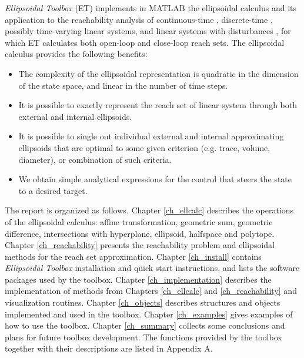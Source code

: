 {\it Ellipsoidal Toolbox} (ET) implements in MATLAB
the ellipsoidal calculus \cite{kurvalyi}
and its application to the reachability analysis of continuous-time
\cite{kurvar01}, discrete-time \cite{kurvar07}, possibly time-varying linear systems,
and linear systems with disturbances \cite{kurvar2},
for which ET calculates both open-loop and close-loop reach sets.
The ellipsoidal calculus provides the following benefits:
\begin{itemize}
\item The complexity of the
ellipsoidal representation is quadratic in the dimension of
the state space, and linear in the number of time steps.
\item It is possible to exactly represent the reach set of
linear system through both external and internal ellipsoids.
\item It is possible to single out individual external and internal
approximating ellipsoids that are optimal to some given criterion
(e.g. trace, volume, diameter), or combination of such criteria.
\item We obtain simple analytical expressions for the control
that steers the state to a desired target.
\end{itemize}
The report is organized as follows.
\newline
Chapter \ref{ch_ellcalc} describes the operations of the
ellipsoidal calculus: affine transformation, geometric sum,
geometric difference, intersections with
hyperplane, ellipsoid, halfspace and polytope.
\newline
Chapter \ref{ch_reachability} presents the reachability problem and
ellipsoidal methods for the reach set approximation.
\newline
Chapter \ref{ch_install} contains {\it Ellipsoidal Toolbox} installation
and quick start instructions, and lists the software packages
used by the toolbox.
\newline
Chapter \ref{ch_implementation} describes the implementation of methods
from Chapters \ref{ch_ellcalc} and \ref{ch_reachability}
and visualization routines.
\newline
Chapter \ref{ch_objects} describes structures and objects implemented and
used in the toolbox.
\newline
Chapter \ref{ch_examples} gives examples of how to use the toolbox.
\newline
Chapter \ref{ch_summary} collects some conclusions and plans for future
toolbox development.
\newline
The functions provided by the toolbox together with their descriptions
are listed in Appendix A.



